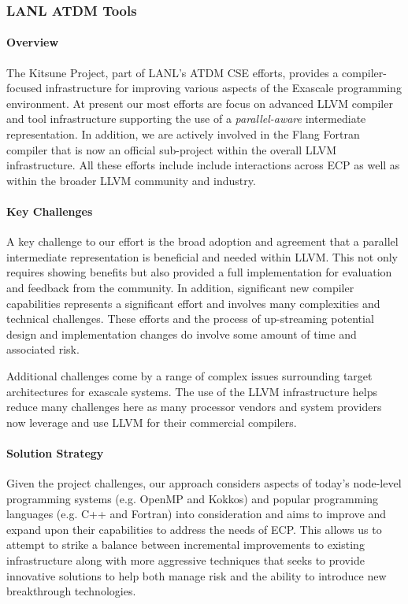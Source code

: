 \subsubsection{ LANL ATDM Tools}

\paragraph{Overview}
The Kitsune Project, part of LANL's ATDM CSE efforts, provides a
compiler-focused infrastructure for improving various aspects of the
Exascale programming environment.  At present our most efforts are
focus on advanced LLVM compiler and tool infrastructure supporting the
use of a \emph{parallel-aware} intermediate representation.  In
addition, we are actively involved in the Flang Fortran compiler that
is now an official sub-project within the overall LLVM infrastructure.
All these efforts include include interactions across ECP as well as
within the broader LLVM community and industry.  

\paragraph{Key Challenges}
A key challenge to our effort is the broad adoption and agreement that
a parallel intermediate representation is beneficial and needed within
LLVM.  This not only requires showing benefits but also provided a
full implementation for evaluation and feedback from the community.
In addition, significant new compiler capabilities represents a
significant effort and involves many complexities and technical
challenges.  These efforts and the process of up-streaming potential
design and implementation changes do involve some amount of time and
associated risk. 

Additional challenges come by a range of complex issues surrounding
target architectures for exascale systems.  The use of the LLVM
infrastructure helps reduce many challenges here as many processor
vendors and system providers now leverage and use LLVM for their
commercial compilers.

\paragraph{Solution Strategy}
Given the project challenges, our approach considers aspects of
today's node-level programming systems (e.g. OpenMP and Kokkos) and
popular programming languages (e.g. C++ and Fortran) into
consideration and aims to improve and expand upon their capabilities
to address the needs of ECP.  This allows us to attempt to strike a
balance between incremental improvements to existing infrastructure
along with more aggressive techniques that seeks to provide innovative
solutions to help both manage risk and the ability to introduce new
breakthrough technologies.

